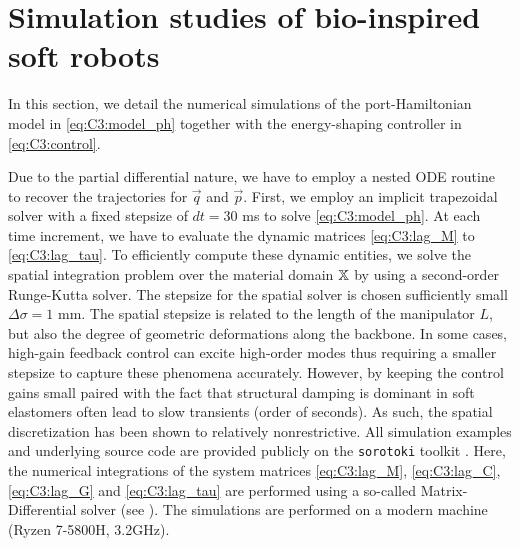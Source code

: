 \section{Simulation studies of bio-inspired soft robots} \label{sec:chap3_result}
In this section, we detail the numerical simulations of the port-Hamiltonian model in \eqref{eq:C3:model_ph} together with the energy-shaping controller in \eqref{eq:C3:control}. 

Due to the partial differential nature, we have to employ a nested ODE routine to recover the trajectories for $\vec{q}$ and $\vec{p}$. First, we employ an implicit trapezoidal solver with a fixed stepsize of $dt = 30 $ ms to solve \eqref{eq:C3:model_ph}. At each time increment, we have to evaluate the dynamic matrices \eqref{eq:C3:lag_M} to \eqref{eq:C3:lag_tau}. To efficiently compute these dynamic entities, we solve the spatial integration problem over the material domain $\mathbb{X}$ by using a second-order Runge-Kutta solver.  The stepsize for the spatial solver is chosen sufficiently small $\Delta \sigma = 1$ mm. The spatial stepsize is related to the length of the manipulator $L$, but also the degree of geometric deformations along the backbone. In some cases, high-gain feedback control can excite high-order modes thus requiring a smaller stepsize to capture these phenomena accurately. However, by keeping the control gains small paired with the fact that structural damping is dominant in soft elastomers often lead to slow transients (order of seconds). As such, the spatial discretization has been shown to relatively nonrestrictive. %
All simulation examples and underlying source code are provided publicly on the \texttt{sorotoki} toolkit \cite{Caasenbrood2020}. Here, the numerical integrations of the system matrices \eqref{eq:C3:lag_M}, \eqref{eq:C3:lag_C}, \eqref{eq:C3:lag_G} and \eqref{eq:C3:lag_tau} are performed using a so-called Matrix-Differential solver (see \cite{Caasenbrood2022}). The simulations are performed on a modern machine (Ryzen 7-5800H, 3.2GHz).

